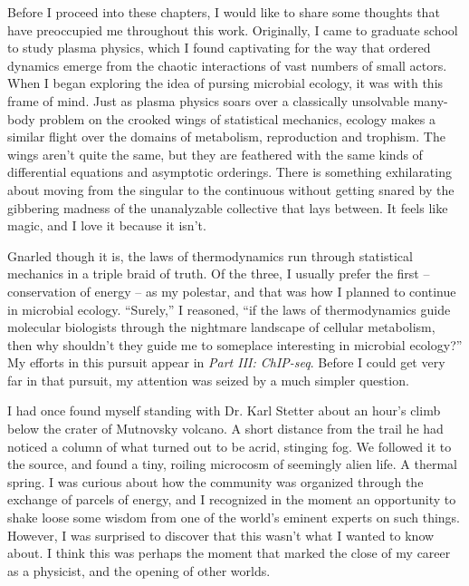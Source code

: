 Before I proceed into these chapters, I would like to share some thoughts that have preoccupied me throughout this work. Originally, I came to graduate school to study plasma physics, which I found captivating for the way that ordered dynamics emerge from the chaotic interactions of vast numbers of small actors. When I began exploring the idea of pursing microbial ecology, it was with this frame of mind. Just as plasma physics soars over a classically unsolvable many-body problem on the crooked wings of statistical mechanics, ecology makes a similar flight over the domains of metabolism, reproduction and trophism. The wings aren't quite the same, but they are feathered with the same kinds of differential equations and asymptotic orderings. There is something exhilarating about moving from the singular to the continuous without getting snared by the gibbering madness of the unanalyzable collective that lays between. It feels like magic, and I love it because it isn't.

Gnarled though it is, the laws of thermodynamics run through statistical mechanics in a triple braid of truth. Of the three, I usually prefer the first -- conservation of energy -- as my polestar, and that was how I planned to continue in microbial ecology. 	``Surely,'' I reasoned, ``if the laws of thermodynamics guide molecular biologists through the nightmare landscape of cellular metabolism, then why shouldn't they guide me to someplace interesting in microbial ecology?'' My efforts in this pursuit appear in {\em Part III: ChIP-seq}. Before I could get very far in that pursuit, my attention was seized by a much simpler question.

I had once found myself standing with Dr. Karl Stetter about an hour's climb below the crater of Mutnovsky volcano. A short distance from the trail he had noticed a column of what turned out to be acrid, stinging fog. We followed it to the source, and found a tiny, roiling microcosm of seemingly alien life. A thermal spring. I was curious about how the community was organized through the exchange of parcels of energy, and I recognized in the moment an opportunity to shake loose some wisdom from one of the world's eminent experts on such things. However, I was surprised to discover that this wasn't what I wanted to know about. I think this was perhaps the moment that marked the close of my career as a physicist, and the opening of other worlds.

